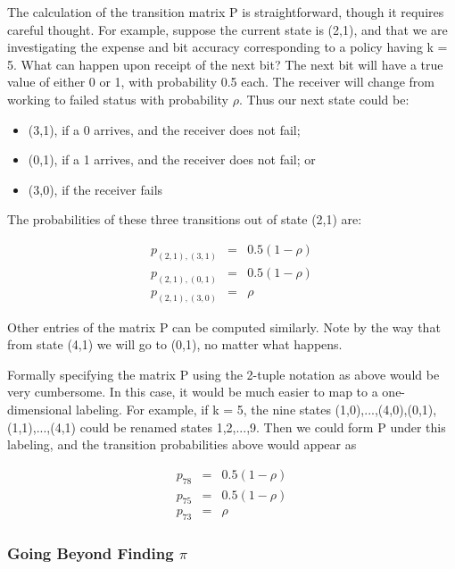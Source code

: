 The calculation of the transition matrix P is straightforward, though it
requires careful thought.  For example, suppose the current state is
(2,1), and that we are investigating the expense and bit accuracy
corresponding to a policy having k = 5. What can happen upon receipt of
the next bit? The next bit will have a true value of either 0 or 1, with
probability 0.5 each. The receiver will change from working to failed
status with probability $\rho$. Thus our next state could be:

\begin{itemize}

\item (3,1), if a 0 arrives, and the receiver does not fail; 

\item (0,1), if a 1 arrives, and the receiver does not fail; or 

\item (3,0), if the receiver fails 

\end{itemize}

The probabilities of these three transitions out of state (2,1) are:

\begin{eqnarray}
p_{(2,1),(3,1)} & = & 0.5(1-\rho ) \\
p_{(2,1),(0,1)} & = & 0.5(1-\rho ) \\  
p_{(2,1),(3,0)} & = & \rho 
\end{eqnarray}  

Other entries of the matrix P can be computed similarly.  Note by the
way that from state (4,1) we will go to (0,1), no matter what happens.

Formally specifying the matrix P using the 2-tuple notation as above
would be very cumbersome.  In this case, it would be much easier to map
to a one-dimensional labeling.  For example, if k = 5, the nine states
(1,0),...,(4,0),(0,1),(1,1),...,(4,1) could be renamed states 1,2,...,9.
Then we could form P under this labeling, and the transition
probabilities above would appear as

\begin{eqnarray}
p_{78} & = & 0.5(1-\rho )\\
p_{75} & = & 0.5(1-\rho )\\
p_{73} & = & \rho 
\end{eqnarray}

\subsubsection{Going Beyond Finding $\pi$}  

